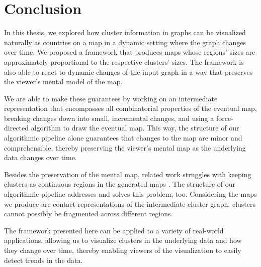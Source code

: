 \chapter{Conclusion}
\label{chap:conclusion}

In this thesis, we explored how cluster information in graphs can be visualized naturally as countries on a map in a dynamic setting where the graph changes over time.
We proposed a framework that produces maps whose regions' sizes are approximately proportional to the respective clusters' sizes.
The framework is also able to react to dynamic changes of the input graph in a way that preserves the viewer's mental model of the map.

We are able to make these guarantees by working on an intermediate representation that encompasses all combinatorial properties of the eventual map, breaking changes down into small, incremental changes, and using a force-directed algorithm to draw the eventual map.
This way, the structure of our algorithmic pipeline alone guarantees that changes to the map are minor and comprehensible, thereby preserving the viewer's mental map as the underlying data changes over time.

Besides the preservation of the mental map, related work struggles with keeping clusters as continuous regions in the generated maps \cite{gansner2009gmap} \cite{mashima2011visualizing}.
The structure of our algorithmic pipeline addresses and solves this problem, too.
Considering the maps we produce are contact representations of the intermediate cluster graph, clusters cannot possibly be fragmented across different regions.

The framework presented here can be applied to a variety of real-world applications, allowing us to visualize clusters in the underlying data and how they change over time, thereby enabling viewers of the visualization to easily detect trends in the data.



